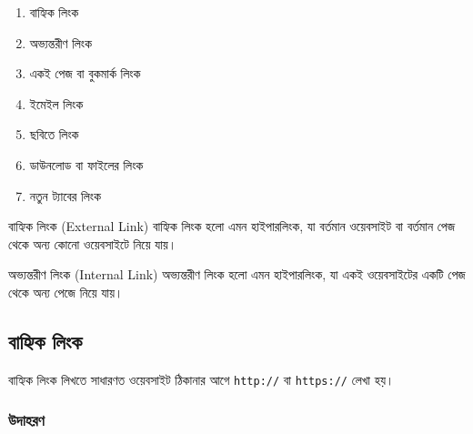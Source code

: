 \begin{enumerate}
\item বাহ্যিক লিংক
\item অভ্যন্তরীণ লিংক
\item একই পেজ বা বুকমার্ক লিংক
\item ইমেইল লিংক
\item ছবিতে লিংক
\item ডাউনলোড বা ফাইলের লিংক
\item নতুন ট্যাবের লিংক
\end{enumerate}

\noindent
\begin{minipage}[t]{.48\linewidth}\vspace{0pt}
\begin{definitionbox}{বাহ্যিক লিংক (External Link)}
বাহ্যিক লিংক হলো এমন হাইপারলিংক, যা বর্তমান ওয়েবসাইট বা বর্তমান পেজ থেকে অন্য কোনো ওয়েবসাইটে নিয়ে যায়।
\end{definitionbox}
\end{minipage}\hfill
\begin{minipage}[t]{.48\linewidth}\vspace{0pt}
\begin{definitionbox}{অভ্যন্তরীণ লিংক (Internal Link)}
অভ্যন্তরীণ লিংক হলো এমন হাইপারলিংক, যা একই ওয়েবসাইটের একটি পেজ থেকে অন্য পেজে নিয়ে যায়।
\end{definitionbox}
\end{minipage}\par

\subsection{বাহ্যিক লিংক}



বাহ্যিক লিংক লিখতে সাধারণত ওয়েবসাইট ঠিকানার আগে \texttt{http://} বা \texttt{https://} লেখা হয়।

\subsubsection{উদাহরণ}


